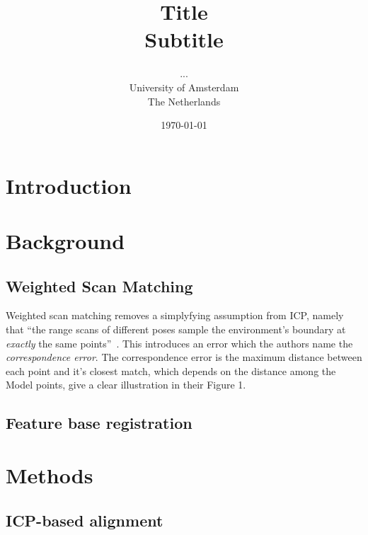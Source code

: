 \documentclass[a4paper]{article}
\title{Title\\
{\large Subtitle}}
\author{...\\
  University of Amsterdam\\
  The Netherlands}
\date{\today}
\begin{document}
\maketitle

\section{Introduction}

\section{Background}

\subsection{Weighted Scan Matching}

Weighted scan matching removes a simplyfying assumption from ICP, namely that ``the range scans of different poses sample the environment's boundary at \emph{exactly} the same points''~\cite{pfister2002weighted}. This introduces an error which the authors name the \emph{correspondence error}. The correspondence error is the maximum distance between each point and it's closest match, which depends on the distance among the Model points, \cite{slamet2008boosting} give a clear illustration in their Figure 1.


\subsection{Feature base registration}

\section{Methods}

\subsection{ICP-based alignment}




{}

\end{document}
